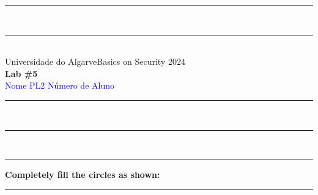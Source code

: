 \documentclass{article} %
\begin{document}
\begin{center}
\rule{\textwidth}{.0075in} \\
\rule[3mm]{\textwidth}{.0075in}\\

Universidade do Algarve\hfill Basics on Security \hfill 2024\\[3ex]

{\Large\bf Lab \#5} \\[3ex]

 \textcolor{blue}{Nome} \hfill  
 \textcolor{blue}{PL2} \hfill
 \textcolor{blue}{Número de Aluno}\\

\rule{\textwidth}{.0075in} \\
\rule[3mm]{\textwidth}{.0075in} \\
\end{center}


\begin{center}
\rule{\textwidth}{0.4pt}
\textbf{Completely fill the circles as shown: \Circle \Circle \CIRCLE \Circle}
\rule{\textwidth}{0.4pt}
\end{center}
\end{document}
